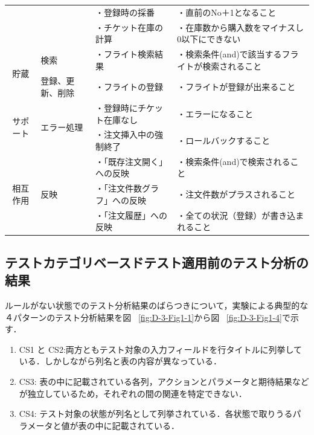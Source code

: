 \begin{table}[htbp]
\begin{tabular}{|c|l|p{10.5em}|p{13em}|}
          &       & ・登録時の採番 & ・直前のNo＋1となること \\
          &       & ・チケット在庫の計算 & ・在庫数から購入数をマイナスし0以下にできない \\
    \hline
    \multicolumn{1}{|c|}{\multirow{2}[4]{*}{貯蔵}} & \multicolumn{1}{p{7.75em}|}{検索} & ・フライト検索結果 & ・検索条件(and)で該当するフライトが検索されること \bigstrut\\
\cline{2-4}          & \multicolumn{1}{p{7.75em}|}{登録、更新、削除} & ・フライトの登録 & ・フライトが登録が出来ること \bigstrut\\
    \hline
    \multicolumn{1}{|c|}{\multirow{2}[2]{*}{サポート}} & \multicolumn{1}{l|}{\multirow{2}[2]{*}{エラー処理}} & ・登録時にチケット在庫なし & ・エラーになること\bigstrut[t]\\
          &       & ・注文挿入中の強制終了 & ・ロールバックすること \bigstrut[b]\\
    \hline
    \multicolumn{1}{|c|}{\multirow{3}[2]{*}{相互作用}} & \multicolumn{1}{l|}{\multirow{3}[2]{*}{反映}} & ・「既存注文開く」への反映 & ・検索条件(and)で検索されること \bigstrut[t]\\
          &       & ・「注文件数グラフ」への反映 & ・注文件数がプラスされること \\
          &       & ・「注文履歴」への反映 & ・全ての状況（登録）が書き込まれること \bigstrut[b]\\
    \hline
    \end{tabular}%
  \label{tab:D-3-ensyu2}%
\end{table}%

\subsection{テストカテゴリベースドテスト適用前のテスト分析の結果}

ルールがない状態でのテスト分析結果のばらつきについて，実験による典型的な４パターンのテスト分析結果を図 ~\ref{fig:D-3-Fig1-1}から図 ~\ref{fig:D-3-Fig1-4}で示す．
\begin{enumerate}
\item CS1 と CS2:両方ともテスト対象の入力フィールドを行タイトルに列挙している．しかしながら列名と表の内容が異なっている．
\item CS3: 表の中に記載されている各列，アクションとパラメータと期待結果などが独立しているため，それぞれの間の関連を特定できない．
\item CS4: テスト対象の状態が列名として列挙されている．各状態で取りうるパラメータと値が表の中に記載されている．
\end{enumerate}

